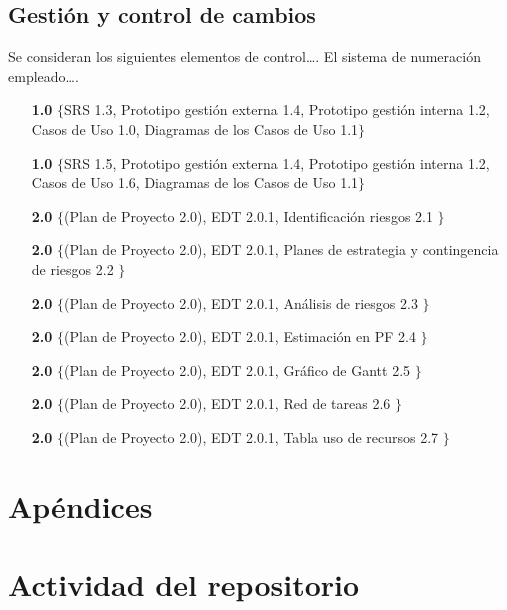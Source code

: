 \documentclass[11pt, a4paper, twoside]{report}
\begin{document}
		\subsection{Gestión y control de cambios}
			Se consideran los siguientes elementos de control\ldots. El sistema de numeración empleado\ldots.
		
		\begin{itemize}
			\item[\bfseries 1.0] $\{$SRS 1.3, Prototipo gestión externa 1.4, Prototipo gestión interna 1.2, Casos de Uso 1.0, Diagramas de los Casos de Uso 1.1$\}$
			\item[\bfseries 1.0] $\{$SRS 1.5, Prototipo gestión externa 1.4, Prototipo gestión interna 1.2, Casos de Uso 1.6, Diagramas de los Casos de Uso 1.1$\}$
			\item[\bfseries 2.0] $\{$(Plan de Proyecto 2.0), EDT 2.0.1, Identificación riesgos 2.1 $\}$
			\item[\bfseries 2.0] $\{$(Plan de Proyecto 2.0), EDT 2.0.1, Planes de estrategia y contingencia de riesgos 2.2 $\}$
			\item[\bfseries 2.0] $\{$(Plan de Proyecto 2.0), EDT 2.0.1, Análisis de riesgos 2.3 $\}$
			\item[\bfseries 2.0] $\{$(Plan de Proyecto 2.0), EDT 2.0.1, Estimación en PF 2.4 $\}$
			\item[\bfseries 2.0] $\{$(Plan de Proyecto 2.0), EDT 2.0.1, Gráfico de Gantt 2.5 $\}$
			\item[\bfseries 2.0] $\{$(Plan de Proyecto 2.0), EDT 2.0.1, Red de tareas 2.6 $\}$
			\item[\bfseries 2.0] $\{$(Plan de Proyecto 2.0), EDT 2.0.1, Tabla uso de recursos 2.7 $\}$
		\end{itemize}
		
	\newpage
	\section{Apéndices}
		\appendix
		\section{Actividad del repositorio}
			
		
		\newpage
		\normalsize
		\nocite{PSMAN}
		
		
\end{document}
